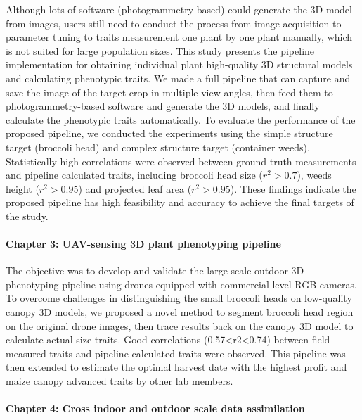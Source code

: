 \begin{eabstract}
  Although lots of software (photogrammetry-based) could generate the 3D model from images, users still need to conduct the process from image acquisition to parameter tuning to traits measurement one plant by one plant manually, which is not suited for large population sizes. This study presents the pipeline implementation for obtaining individual plant high-quality 3D structural models and calculating phenotypic traits. We made a full pipeline that can capture and save the image of the target crop in multiple view angles, then feed them to photogrammetry-based software and generate the 3D models, and finally calculate the phenotypic traits automatically. To evaluate the performance of the proposed pipeline, we conducted the experiments using the simple structure target (broccoli head) and complex structure target (container weeds). Statistically high correlations were observed between ground-truth measurements and pipeline calculated traits, including broccoli head size ($r^2>0.7$), weeds height ($r^2>0.95$) and projected leaf area ($r^2>0.95$). These findings indicate the proposed pipeline has high feasibility and accuracy to achieve the final targets of the study.

 \paragraph{Chapter 3: UAV-sensing 3D plant phenotyping pipeline}

  The objective was to develop and validate the large-scale outdoor 3D phenotyping pipeline using drones equipped with commercial-level \acrfull{RGB} cameras. To overcome challenges in distinguishing the small broccoli heads on low-quality canopy 3D models, we proposed a novel method to segment broccoli head region on the original drone images, then trace results back on the canopy 3D model to calculate actual size traits. Good correlations (0.57<r2<0.74) between field-measured traits and pipeline-calculated traits were observed.
  This pipeline was then extended to estimate the optimal harvest date with the highest profit and maize canopy advanced traits by other lab members.
  

  \paragraph{Chapter 4: Cross indoor and outdoor scale data assimilation}


\end{eabstract}
